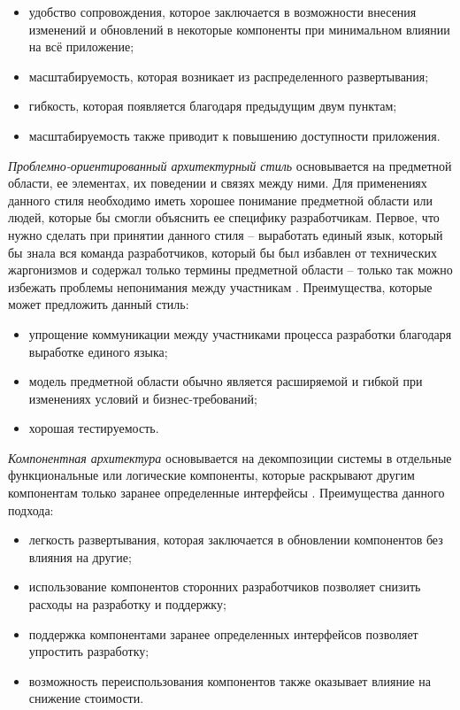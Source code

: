 \begin{itemize}
	\item удобство сопровождения, которое заключается в возможности внесения изменений и обновлений в некоторые компоненты при минимальном влиянии на всё приложение;
	\item масштабируемость, которая возникает из распределенного развертывания;
	\item гибкость, которая появляется благодаря предыдущим двум пунктам;
	\item масштабируемость также приводит к повышению доступности приложения.
\end{itemize}

\emph{Проблемно-ориентированный архитектурный стиль} основывается на предметной области, ее элементах, их поведении и связях между ними. Для применениях данного стиля необходимо иметь хорошее понимание предметной области или людей, которые бы смогли объяснить ее специфику разработчикам. Первое, что нужно сделать при принятии данного стиля -- выработать единый язык, который бы знала вся команда разработчиков, который бы был избавлен от технических жаргонизмов и содержал только термины предметной области -- только так можно избежать проблемы непонимания между участникам \cite{ddd_quickly}. Преимущества, которые может предложить данный стиль:

\begin{itemize}
	\item упрощение коммуникации между участниками процесса разработки благодаря выработке единого языка;
	\item модель предметной области обычно является расширяемой и гибкой при изменениях условий и бизнес-требований;
	\item хорошая тестируемость.
\end{itemize}


\pagebreak
\emph{Компонентная архитектура} основывается на декомпозиции системы в отдельные функциональные или логические компоненты, которые раскрывают другим компонентам только заранее определенные интерфейсы \cite{application_architecture_guide}. Преимущества данного подхода:

\begin{itemize}
	\item легкость развертывания, которая заключается в обновлении компонентов без влияния на другие;
	\item использование компонентов сторонних разработчиков позволяет снизить расходы на разработку и поддержку;
	\item поддержка компонентами заранее определенных интерфейсов позволяет упростить разработку;
	\item возможность переиспользования компонентов также оказывает влияние на снижение стоимости.
\end{itemize}


